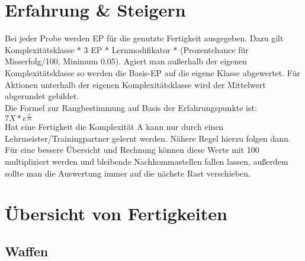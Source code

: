 \documentclass[a4paper,12pt,oneside]{book}
\begin{document}
\section{Erfahrung \& Steigern}
Bei jeder Probe werden EP für die genutzte Fertigkeit ausgegeben. Dazu gilt Komplexitätsklasse * 3 EP * Lernmodifikator * (Prozentchance für Misserfolg/100, Minimum 0.05). Agiert man außerhalb der eigenen Komplexitätsklasse so werden die Basis-EP auf die eigene Klasse abgewertet. Für Aktionen unterhalb der eigenen Komplexitätsklasse wird der Mittelwert abgerundet gebildet.
\\Die Formel zur Rangbestimmung auf Basis der Erfahrungspunkte ist:\\$7X*e^{\frac{x}{10}}$
\\Hat eine Fertigkeit die Komplexität A kann nur durch einen Lehrmeister/Trainingpartner gelernt werden. Nähere Regel hierzu folgen dann.
\\Für eine bessere Übersicht und Rechnung können diese Werte mit 100 multipliziert werden und bleibende Nachkommastellen fallen lassen, außerdem sollte man die Auswertung immer auf die nächste Rast verschieben.
\section{Übersicht von Fertigkeiten}
\subsection{Waffen}
\end{document}
